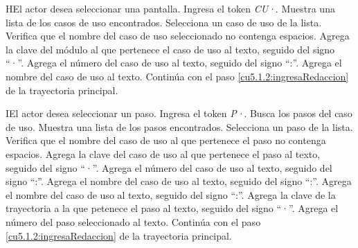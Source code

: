  \begin{UCtrayectoriaA}{H}{El actor desea seleccionar una pantalla.}
 	\UCpaso[\UCactor] Ingresa el token {\it CU·}.
  	\UCpaso[\UCsist] Muestra una lista de los casos de uso encontrados.
 	\UCpaso[\UCactor] Selecciona un caso de uso de la lista.
  	\UCpaso[\UCsist] Verifica que el nombre del caso de uso seleccionado no contenga espacios. 
  	\UCpaso[\UCsist] Agrega la clave del módulo al que pertenece el caso de uso al texto, seguido del signo ``·''.
  	\UCpaso[\UCsist] Agrega el número del caso de uso al texto, seguido del signo ``:''.
  	\UCpaso[\UCsist] Agrega el nombre del caso de uso al texto.
    \UCpaso[] Continúa con el paso \ref{cu5.1.2:ingresaRedaccion} de la trayectoria principal.
 \end{UCtrayectoriaA}
 \begin{UCtrayectoriaA}{I}{El actor desea seleccionar un paso.}
 	\UCpaso[\UCactor] Ingresa el token {\it P·}.
	\UCpaso[\UCsist] Busca los pasos del caso de uso.
  	\UCpaso[\UCsist] Muestra una lista de los pasos encontrados.
 	\UCpaso[\UCactor] Selecciona un paso de la lista.
  	\UCpaso[\UCsist] Verifica que el nombre del caso de uso al que pertenece el paso no contenga espacios. 
  	\UCpaso[\UCsist] Agrega la clave del caso de uso al que pertenece el paso al texto, seguido del signo ``·''.
  	\UCpaso[\UCsist] Agrega el número del caso de uso al texto, seguido del signo ``:''.
  	\UCpaso[\UCsist] Agrega el nombre del caso de uso al texto, seguido del signo ``:''.
  	\UCpaso[\UCsist] Agrega el nombre del caso de uso al texto, seguido del signo ``:''.
  	\UCpaso[\UCsist] Agrega la clave de la trayectoria a la que petenece el paso al texto, seguido del signo ``·''.
  	\UCpaso[\UCsist] Agrega el número del paso seleccionado al texto.
    \UCpaso[] Continúa con el paso \ref{cu5.1.2:ingresaRedaccion} de la trayectoria principal.
 \end{UCtrayectoriaA}
